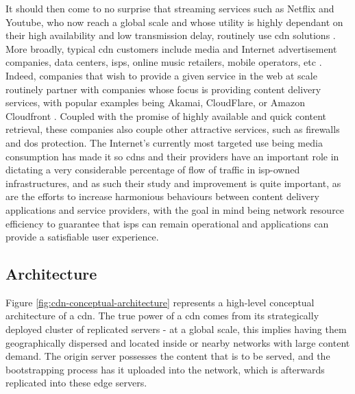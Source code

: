     It should then come to no surprise that streaming services such as Netflix and Youtube, who now reach a global scale and whose utility is highly dependant on their high availability and low transmission delay, routinely use \gls{cdn} solutions .
    More broadly, typical \gls{cdn} customers include media and Internet advertisement companies, data centers, \glspl{isp}, online music retailers, mobile operators, etc \cite{cdn-survey}.
    Indeed, companies that wish to provide a given service in the web at scale routinely partner with companies whose focus is providing content delivery services, with popular examples being Akamai, CloudFlare, or Amazon Cloudfront .
    Coupled with the promise of highly available and quick content retrieval, these companies also couple other attractive services, such as firewalls and \gls{dos} protection.
    The Internet's currently most targeted use being media consumption has made it so \glspl{cdn} and their providers have an important role in dictating a very considerable percentage of flow of traffic in \gls{isp}-owned infrastructures, and as such their study and improvement is quite important, as are the efforts to increase harmonious behaviours between content delivery applications and service providers, with the goal in mind being network resource efficiency to guarantee that \glspl{isp} can remain operational and applications can provide a satisfiable user experience.

\subsection{Architecture}

\label{ssec:cdn-architecture}

    Figure \ref{fig:cdn-conceptual-architecture} represents a high-level conceptual architecture of a \gls{cdn}.
    The true power of a \gls{cdn} comes from its strategically deployed cluster of replicated servers - at a global scale, this implies having them geographically dispersed and located inside or nearby networks with large content demand.
    The origin server possesses the content that is to be served, and the bootstrapping process has it uploaded into the network, which is afterwards replicated into these edge servers.

